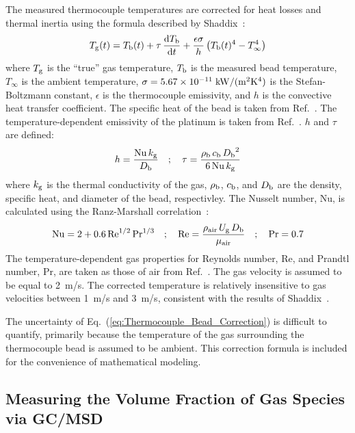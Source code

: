 \documentclass[12pt]{article}
\begin{document}
The measured thermocouple temperatures are corrected for heat losses and thermal inertia using the formula described by Shaddix~\cite{Shaddix1999}: 
\begin{equation}\label{eq:Thermocouple_Bead_Correction}
   {T_{\rm g}(t)}= T_{\rm b}(t) + \tau \, \frac{{\rm d}T_{\rm b}}{{\rm d}t} + \frac{\epsilon\sigma}{h}\left(T_{\rm b}(t)^4-T_\infty^4\right)
\end{equation}
where $T_{\rm g}$ is the ``true'' gas temperature, $T_{\rm b}$ is the measured bead temperature, $T_\infty$ is the ambient temperature, $\sigma=5.67 \times 10^{-11} \; {\rm kW}/({\rm m}^2{\rm K}^4)$ is the Stefan-Boltzmann constant, $\epsilon$ is the thermocouple emissivity, and $h$ is the convective heat transfer coefficient. The specific heat of the bead is taken from Ref.~\cite{Jaeger1939}. The temperature-dependent emissivity of the platinum is taken from Ref.~\cite{Incropera2007}. $h$ and $\tau$ are defined:
\begin{equation}\label{eq:h_eqn}
h=\frac{{\rm Nu} \, k_{\rm g}}{D_{\rm b}}  \quad ; \quad \tau= \frac{\rho_{\rm b} \, c_{\rm b} \, {D_{\rm b}}^2}{6 \, {\rm Nu} \, k_{\rm g}}
\end{equation}
where $k_{\rm g}$ is the thermal conductivity of the gas, $\rho_{\rm b}$, $c_{\rm b}$, and $D_{\rm b}$ are the density, specific heat, and diameter of the bead, respectivley. The Nusselt number, Nu, is calculated using the Ranz-Marshall correlation~\cite{Shaddix1999}:
\begin{equation}\label{eq:Nu_number}
{\rm Nu} = 2 + 0.6 \, \textrm{Re}^{1/2} \, \textrm{Pr}^{1/3} \quad ; \quad \textrm{Re} = \frac{ \rho_{\rm air} \, U_{\rm g} \, D_{\rm b} }{\mu_{\rm air}}  \quad ; \quad \textrm{Pr}=0.7
\end{equation}
The temperature-dependent gas properties for Reynolds number, Re, and Prandtl number, Pr, are taken as those of air from Ref.~\cite{Dippr}. The gas velocity is assumed to be equal to 2~m/s. The corrected temperature is relatively insensitive to gas velocities between 1~m/s and 3~m/s, consistent with the results of Shaddix~\cite{Shaddix1999}. 

The uncertainty of Eq.~(\ref{eq:Thermocouple_Bead_Correction}) is difficult to quantify, primarily because the temperature of the gas surrounding the thermocouple bead is assumed to be ambient. This correction formula is included for the convenience of mathematical modeling.


\subsection{Measuring the Volume Fraction of Gas Species via GC/MSD}
\label{ssec:Gas_Species_Setup}
\end{document}
